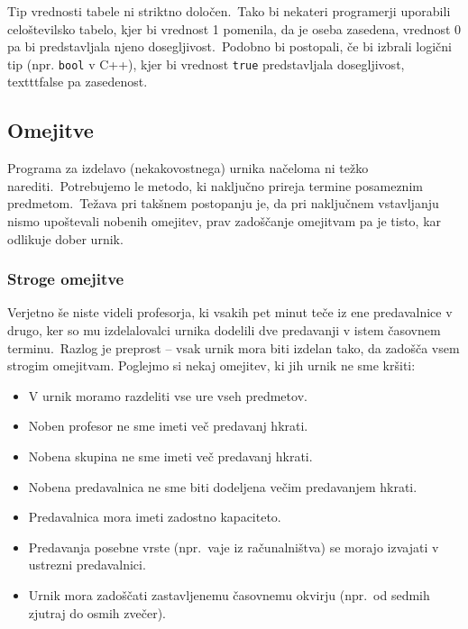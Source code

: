 \documentclass[a4paper,10pt]{article}
\begin{document}
Tip vrednosti tabele ni striktno določen.\ Tako bi nekateri programerji uporabili
celoštevilsko tabelo, kjer bi vrednost 1 pomenila, da je oseba zasedena, vrednost 0
pa bi predstavljala njeno dosegljivost.\ Podobno bi postopali, če bi izbrali logični
tip (npr. \texttt{bool} v C++), kjer bi vrednost \texttt{true} predstavljala
dosegljivost, texttt{false} pa zasedenost.

\subsection{Omejitve} %

Programa za izdelavo (nekakovostnega) urnika načeloma ni težko narediti.\ Potrebujemo
le metodo, ki naključno prireja termine posameznim predmetom.\ Težava pri takšnem postopanju
je, da pri naključnem vstavljanju nismo upoštevali nobenih omejitev, prav zadoščanje omejitvam
pa je tisto, kar odlikuje dober urnik.

\subsubsection{Stroge omejitve} %

Verjetno še niste videli profesorja, ki vsakih pet minut teče iz ene predavalnice v drugo,
ker so mu izdelalovalci urnika dodelili dve predavanji v istem časovnem terminu.\ Razlog
je preprost -- vsak urnik mora biti izdelan tako, da zadošča vsem strogim omejitvam.
Poglejmo si nekaj omejitev, ki jih urnik ne sme kršiti:

   \begin{itemize}
	\item V urnik moramo razdeliti vse ure vseh predmetov.
   \item Noben profesor ne sme imeti več predavanj hkrati.
   \item Nobena skupina ne sme imeti več predavanj hkrati.
   \item Nobena predavalnica ne sme biti dodeljena večim predavanjem hkrati.
   \item Predavalnica mora imeti zadostno kapaciteto.
   \item Predavanja posebne vrste (npr.\ vaje iz računalništva) se morajo izvajati v ustrezni predavalnici.
   \item Urnik mora zadoščati zastavljenemu časovnemu okvirju (npr.\ od sedmih zjutraj do osmih zvečer).
\end{itemize}
\end{document}
